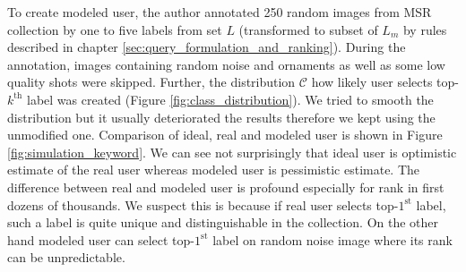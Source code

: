 To create modeled user, the author annotated 250 random images from MSR collection by one to five labels from set $L$ (transformed to subset of $L_m$ by rules described in chapter \ref{sec:query_formulation_and_ranking}). During the annotation, images containing random noise and ornaments as well as some low quality shots were skipped. Further, the distribution $\mathcal{C}$ how likely user selects top-$k^{\mathrm{th}}$ label was created (Figure \ref{fig:class_distribution}). We tried to smooth the distribution but it usually deteriorated the results therefore we kept using the unmodified one. Comparison of ideal, real and modeled user is shown in Figure \ref{fig:simulation_keyword}. We can see not surprisingly that ideal user is optimistic estimate of the real user whereas modeled user is pessimistic estimate. The difference between real and modeled user is profound especially for rank in first dozens of thousands. We suspect this is because if real user selects top-$1^{\mathrm{st}}$ label, such a label is quite unique and distinguishable in the collection. On the other hand modeled user can select top-$1^{\mathrm{st}}$ label on random noise image where its rank can be unpredictable.

